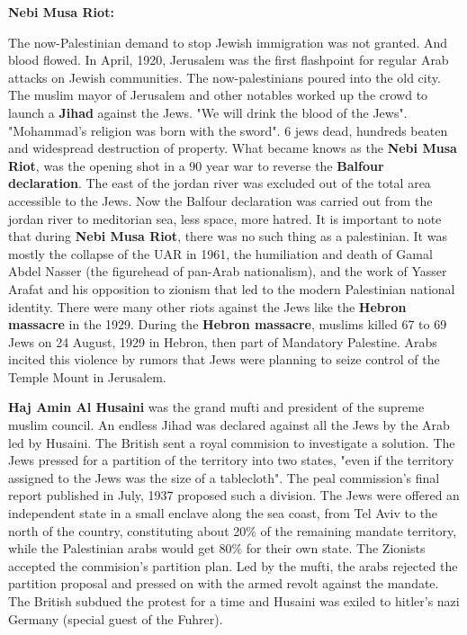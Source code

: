 \noindent\textbf{Nebi Musa Riot: }

\noindent The now-Palestinian demand to stop Jewish immigration was not granted. And blood flowed. In April,
1920, Jerusalem was the first flashpoint for regular Arab attacks on Jewish communities. The now-palestinians
poured into the old city. The muslim mayor of Jerusalem and other notables worked up the crowd to 
launch a \textbf{Jihad} against the Jews. "We will drink the blood of the Jews". "Mohammad's religion was
born with the sword". 6 jews dead, hundreds beaten and widespread destruction of property. What became
knows as the \textbf{Nebi Musa Riot}, was the opening shot in a 90 year war to reverse the \textbf{Balfour
declaration}. The east of the jordan river was excluded out of the total area accessible to the Jews.
Now the Balfour declaration was carried out from the jordan river to meditorian sea, less space, more
hatred. It is important to note that during \textbf{Nebi Musa Riot}, there was no such thing as a palestinian.
It was mostly the collapse of the UAR in 1961, the humiliation and death of Gamal Abdel Nasser (the figurehead 
of pan-Arab nationalism), and the work of Yasser Arafat and his opposition to zionism that led to the modern
Palestinian national identity. There were many other riots against the Jews like the \textbf{Hebron massacre}
in the 1929. During the \textbf{Hebron massacre}, muslims killed 67 to 69 Jews on 24 August, 1929 in Hebron,
then part of Mandatory Palestine. Arabs incited this violence by rumors that Jews were planning to seize
control of the Temple Mount in Jerusalem.

\textbf{Haj Amin Al Husaini} was the grand mufti and president of the supreme muslim council. An endless
Jihad was declared against all the Jews by the Arab led by Husaini. The British sent a royal commision
to investigate a solution. The Jews pressed for a partition of the territory into two states, "even
if the territory assigned to the Jews was the size of a tablecloth". The peal commission's final report
published in July, 1937 proposed such a division. The Jews were offered an independent state in a small
enclave along the sea coast, from Tel Aviv to the north of the country, constituting about 20\% of the 
remaining mandate territory, while the Palestinian arabs would get 80\% for their own state. The Zionists
accepted the commision's partition plan. Led by the mufti, the arabs rejected the partition proposal and
pressed on with the armed revolt against the mandate. The British subdued the protest for a time and Husaini
was exiled to hitler's nazi Germany (special guest of the Fuhrer).

